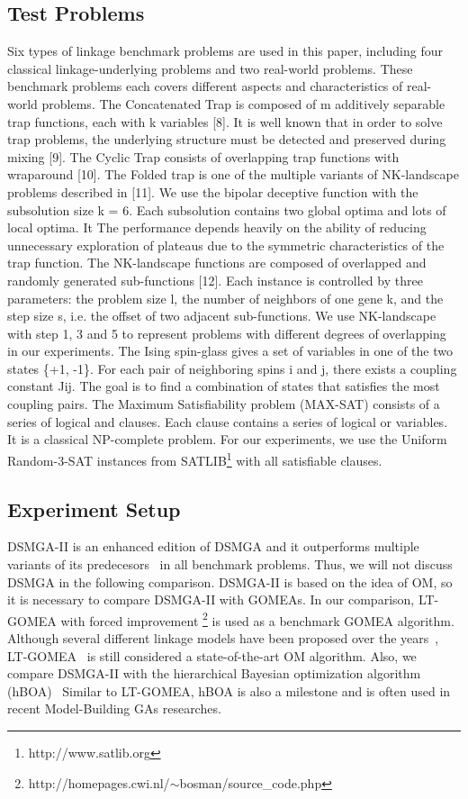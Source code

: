 \documentclass{sig-alternate-05-2015}
\begin{document}
\subsection{Test Problems}
Six types of linkage benchmark problems are used in this paper, including four classical linkage-underlying problems and two real-world problems. These benchmark problems each covers different aspects and characteristics of real-world problems. The Concatenated Trap is composed of m additively separable trap functions, each with k variables [8]. It is well known that in order to solve trap problems, the underlying structure must be detected and preserved during mixing [9]. The Cyclic Trap consists of overlapping trap functions with wraparound [10]. The Folded trap is one of the multiple variants of NK-landscape problems described in [11]. We use the bipolar deceptive function with the subsolution size k = 6. Each subsolution contains two global optima and lots of local optima. It The performance depends heavily on the ability of reducing unnecessary exploration of plateaus due to the symmetric characteristics of the trap function. The NK-landscape functions are composed of overlapped and randomly generated sub-functions [12]. Each instance is controlled by three parameters: the problem size l, the number of neighbors of one gene k, and the step size s, i.e. the offset of two adjacent sub-functions. We use NK-landscape with step 1, 3 and 5 to represent problems with different degrees of overlapping in our experiments. The Ising spin-glass gives a set of variables in one of the two states \{+1, -1\}. For each pair of neighboring spins i and j, there exists a coupling constant Jij. The goal is to find a combination of states that satisfies the most coupling pairs. The Maximum Satisfiability problem (MAX-SAT) consists of a series of logical and clauses. Each clause contains a series of logical or variables. It is a classical NP-complete problem.  
For our experiments, we use the Uniform Random-3-SAT instances from SATLIB\footnote{http://www.satlib.org} with all satisfiable clauses.



\subsection{Experiment Setup}
DSMGA-II is an enhanced edition of DSMGA and it outperforms multiple variants of its predecesors~\cite{yu:DSMGA} in all benchmark problems. 
Thus, we will not discuss DSMGA in the following comparison.
DSMGA-II is based on the idea of OM, so it is necessary to compare DSMGA-II with GOMEAs. 
In our comparison, LT-GOMEA with forced improvement \footnote{http://homepages.cwi.nl/$\sim$bosman/source\_code.php} is used as a benchmark GOMEA algorithm.
Although several different linkage models have been proposed over the years~\cite{bosman:robust}, LT-GOMEA~\cite{bosman:LT-GOMEA} is still considered a state-of-the-art OM algorithm.
Also, we compare DSMGA-II with the hierarchical Bayesian optimization algorithm (hBOA)~\cite{pelikan:hBOA}
Similar to LT-GOMEA, hBOA is also a milestone and is often used in recent Model-Building GAs researches.
\end{document}
